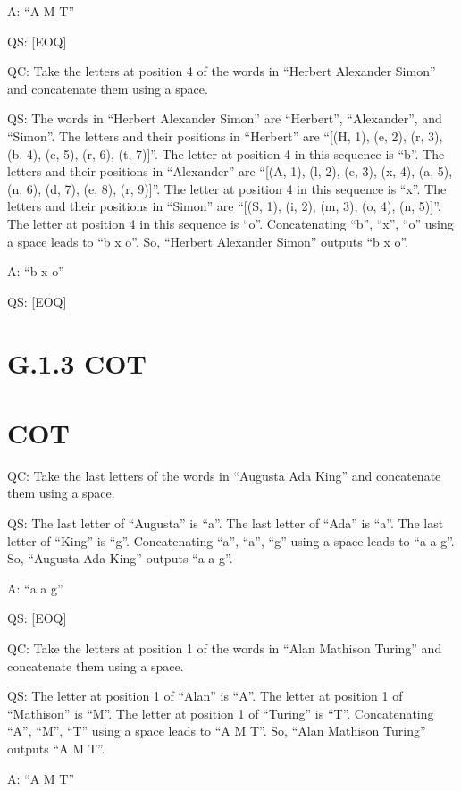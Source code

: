 \documentclass[
]{article}
\begin{document}
A: ``A M T''

QS: {[}EOQ{]}

QC: Take the letters at position 4 of the words in ``Herbert Alexander
Simon'' and concatenate them using a space.

QS: The words in ``Herbert Alexander Simon'' are ``Herbert'',
``Alexander'', and ``Simon''. The letters and their positions in
``Herbert'' are ``{[}(H, 1), (e, 2), (r, 3), (b, 4), (e, 5), (r, 6), (t,
7){]}''. The letter at position 4 in this sequence is ``b''. The letters
and their positions in ``Alexander'' are ``{[}(A, 1), (l, 2), (e, 3),
(x, 4), (a, 5), (n, 6), (d, 7), (e, 8), (r, 9){]}''. The letter at
position 4 in this sequence is ``x''. The letters and their positions in
``Simon'' are ``{[}(S, 1), (i, 2), (m, 3), (o, 4), (n, 5){]}''. The
letter at position 4 in this sequence is ``o''. Concatenating ``b'',
``x'', ``o'' using a space leads to ``b x o''. So, ``Herbert Alexander
Simon'' outputs ``b x o''.

A: ``b x o''

QS: {[}EOQ{]}

\section{G.1.3 COT}\label{g.1.3-cot}

\section{COT}\label{cot}

QC: Take the last letters of the words in ``Augusta Ada King'' and
concatenate them using a space.

QS: The last letter of ``Augusta'' is ``a''. The last letter of ``Ada''
is ``a''. The last letter of ``King'' is ``g''. Concatenating ``a'',
``a'', ``g'' using a space leads to ``a a g''. So, ``Augusta Ada King''
outputs ``a a g''.

A: ``a a g''

QS: {[}EOQ{]}

QC: Take the letters at position 1 of the words in ``Alan Mathison
Turing'' and concatenate them using a space.

QS: The letter at position 1 of ``Alan'' is ``A''. The letter at
position 1 of ``Mathison'' is ``M''. The letter at position 1 of
``Turing'' is ``T''. Concatenating ``A'', ``M'', ``T'' using a space
leads to ``A M T''. So, ``Alan Mathison Turing'' outputs ``A M T''.

A: ``A M T''
\end{document}

